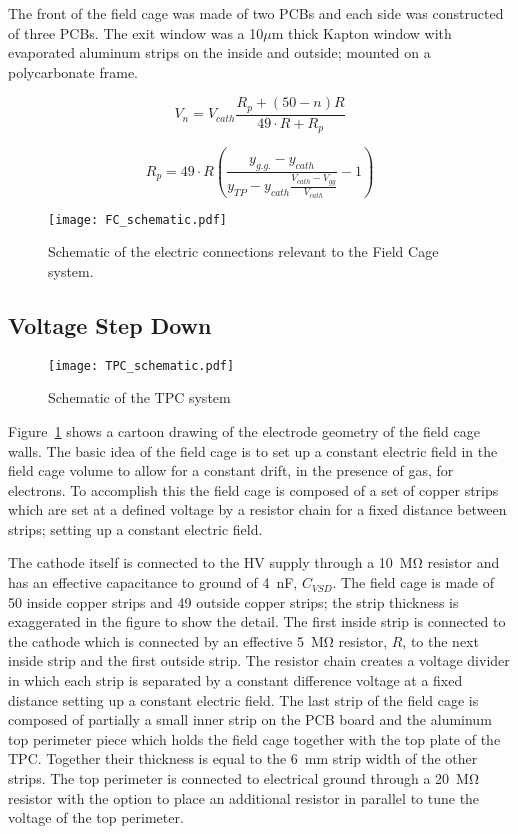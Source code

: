 The front of the field cage was made of two PCBs and each side was constructed of three PCBs. The exit window was a 10$\mu$m thick Kapton window with evaporated aluminum strips on the inside and outside; mounted on a polycarbonate frame.


\begin{equation}
V_n = V_{cath} \frac{R_p + (50 - n)R}{49\cdot R + R_p}
\label{eq:FCstrip}
\end{equation}

\begin{equation}
R_p = 49 \cdot R  \left(\frac{ y_{g.g.} - y_{cath} }{ y_{TP} - y_{cath} \frac{V_{cath} - V_{gg}}{V_{cath}} }- 1 \right)
\label{eq:TP_resistor}
\end{equation}

\begin{figure}[!htb]
\texttt{[image: FC\_schematic.pdf]}
\label{fig:FC_schematic}
\caption{Schematic of the electric connections relevant to the Field Cage system.}
\end{figure}
\subsection{Voltage Step Down}



\begin{figure}[!htb]
\texttt{[image: TPC\_schematic.pdf]}
\caption{Schematic of the TPC system}
\label{fig:TPC_schematic}
\end{figure}

Figure~\ref{fig:FC_schematic} shows a cartoon drawing of the electrode geometry of the field cage walls. The basic idea of the field cage is to set up a constant electric field in the field cage volume to allow for a constant drift, in the presence of gas, for electrons. To accomplish this the field cage is composed of a set of copper strips which are set at a defined voltage by a resistor chain for a fixed distance between strips; setting up a constant electric field. 

The cathode itself is connected to the HV supply through a \SI{10}{\mega\ohm} resistor and has an effective capacitance to ground of \SI{4}{\nano\farad}, $C_{VSD}$. The field cage is made of 50 inside copper strips and 49 outside copper strips; the strip thickness is exaggerated in the figure to show the detail. The first inside strip is connected to the cathode which is connected by an effective \SI{5}{\mega\ohm} resistor, $R$, to the next inside strip and the first outside strip. The resistor chain creates a voltage divider in which each strip is separated by a constant difference voltage at a fixed distance setting up a constant electric field. The last strip of the field cage is composed of partially a small inner strip on the PCB board and the aluminum top perimeter piece which holds the field cage together with the top plate of the TPC. Together their thickness is equal to the \SI{6}{\milli\metre} strip width of the other strips. The top perimeter is connected to electrical ground through a \SI{20}{\mega\ohm} resistor with the option to place an additional resistor in parallel to tune the voltage of the top perimeter. 



